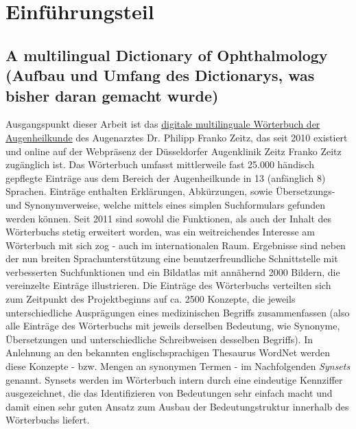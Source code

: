 \documentclass[pagesize,DIV=calc,12pt,draft]{scrreprt}
\begin{document}

\chapter{Einführungsteil}

\section{A multilingual Dictionary of Ophthalmology (Aufbau und Umfang des Dictionarys, was bisher daran gemacht wurde)}

Ausgangspunkt dieser Arbeit ist das \href{http://www.zeitzfrankozeitz.de/index.php/fachwoerterbuch.html}{digitale multilinguale Wörterbuch der Augenheilkunde} des Augenarztes Dr. 
Philipp Franko Zeitz, das seit 2010 existiert und online auf der Webpräsenz der Düsseldorfer Augenklinik Zeitz Franko Zeitz zugänglich ist. Das Wörterbuch umfasst mittlerweile fast 25.000 händisch gepflegte Einträge aus dem Bereich der Augenheilkunde in 13 (anfänglich 8) Sprachen. 
Einträge enthalten Erklärungen, Abkürzungen, sowie Übersetzungs- und Synonymverweise, welche mittels eines simplen Suchformulars gefunden werden können. 
Seit 2011 sind sowohl die Funktionen, als auch der Inhalt des Wörterbuchs stetig erweitert worden, was ein weitreichendes Interesse am Wörterbuch mit sich zog - auch im internationalen Raum. 
Ergebnisse sind neben der nun breiten Sprachunterstützung eine benutzerfreundliche Schnittstelle mit verbesserten Suchfunktionen und ein Bildatlas mit annähernd 2000 Bildern, die vereinzelte Einträge illustrieren. Die Einträge des Wörterbuchs verteilten sich zum Zeitpunkt des Projektbeginns auf ca. 2500 Konzepte, die jeweils unterschiedliche Ausprägungen eines medizinischen Begriffs zusammenfassen (also alle Einträge des Wörterbuchs mit jeweils derselben Bedeutung, wie Synonyme, Übersetzungen und unterschiedliche Schreibweisen desselben Begriffs). 
In Anlehnung an den bekannten englischsprachigen Thesaurus WordNet werden diese Konzepte - bzw. 
Mengen an synonymen Termen - im Nachfolgenden \emph{Synsets} genannt. 
Synsets werden im Wörterbuch intern durch eine eindeutige Kennziffer ausgezeichnet, die das Identifizieren von Bedeutungen sehr einfach macht und damit einen sehr guten Ansatz zum Ausbau der Bedeutungstruktur innerhalb des Wörterbuchs liefert.
\end{document}
